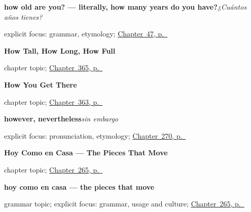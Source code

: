 \noindent\begin{minipage}[t]{\linewidth}
\raggedright
\textbf{how old are you? — literally, how many years do you have?}\enspace\emph{¿Cuántos años tienes?}\par
\footnotesize explicit focus: grammar, etymology; \hyperref[ch:numbers-and-age]{Chapter~47, p.~\pageref*{ch:numbers-and-age}}
\end{minipage}\par\smallskip

\noindent\begin{minipage}[t]{\linewidth}
\raggedright
\textbf{How Tall, How Long, How Full}\par
\footnotesize chapter topic; \hyperref[ch:alto-y-largo]{Chapter~365, p.~\pageref*{ch:alto-y-largo}}
\end{minipage}\par\smallskip

\noindent\begin{minipage}[t]{\linewidth}
\raggedright
\textbf{How You Get There}\par
\footnotesize chapter topic; \hyperref[ch:el-coche-y-el-avion]{Chapter~363, p.~\pageref*{ch:el-coche-y-el-avion}}
\end{minipage}\par\smallskip

\noindent\begin{minipage}[t]{\linewidth}
\raggedright
\textbf{however, nevertheless}\enspace\emph{sin embargo}\par
\footnotesize explicit focus: pronunciation, etymology; \hyperref[ch:argumentar]{Chapter~270, p.~\pageref*{ch:argumentar}}
\end{minipage}\par\smallskip

\noindent\begin{minipage}[t]{\linewidth}
\raggedright
\textbf{Hoy Como en Casa --- The Pieces That Move}\par
\footnotesize chapter topic; \hyperref[ch:hoy-como]{Chapter~265, p.~\pageref*{ch:hoy-como}}
\end{minipage}\par\smallskip

\noindent\begin{minipage}[t]{\linewidth}
\raggedright
\textbf{hoy como en casa — the pieces that move}\par
\footnotesize grammar topic; explicit focus: grammar, usage and culture; \hyperref[ch:hoy-como]{Chapter~265, p.~\pageref*{ch:hoy-como}}
\end{minipage}\par\smallskip

